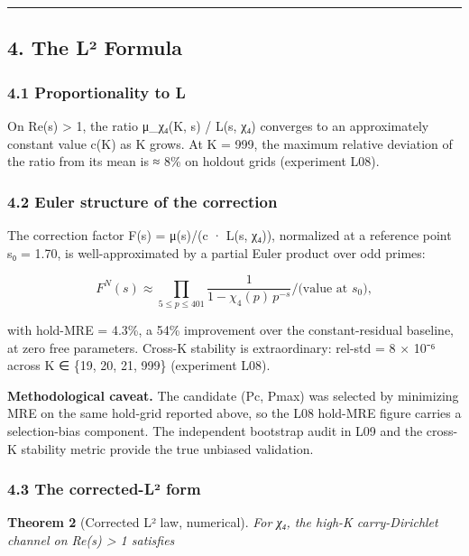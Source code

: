 \documentclass[
  11pt,
]{article}
\begin{document}
\begin{center}\rule{0.5\linewidth}{0.5pt}\end{center}

\newpage

\subsection{4. The L² Formula}\label{the-luxb2-formula}

\subsubsection{4.1 Proportionality to L}\label{proportionality-to-l}

On Re(s) \textgreater{} 1, the ratio μ\_χ₄(K, s) / L(s, χ₄) converges to an
approximately constant value c(K) as K grows. At K = 999, the maximum relative
deviation of the ratio from its mean is ≈ 8\% on holdout grids (experiment L08).

\subsubsection{4.2 Euler structure of the
correction}\label{euler-structure-of-the-correction}

The correction factor F(s) = μ(s)/(c · L(s, χ₄)), normalized at a reference
point s₀ = 1.70, is well-approximated by a partial Euler product over odd
primes:

\[F^N(s) \approx \prod_{5 \leq p \leq 401} \frac{1}{1 - \chi_4(p)\, p^{-s}} \bigg/ \text{(value at } s_0\text{)},\]

with hold-MRE = 4.3\%, a 54\% improvement over the constant-residual baseline,
at zero free parameters. Cross-K stability is extraordinary: rel-std = 8 × 10⁻⁶
across K ∈ \{19, 20, 21, 999\} (experiment L08).

\textbf{Methodological caveat.} The candidate (Pc, Pmax) was selected by
minimizing MRE on the same hold-grid reported above, so the L08 hold-MRE figure
carries a selection-bias component. The independent bootstrap audit in L09 and
the cross-K stability metric provide the true unbiased validation.

\subsubsection{4.3 The corrected-L² form}\label{the-corrected-luxb2-form}

\textbf{Theorem 2} (Corrected L² law, numerical). \emph{For χ₄, the high-K
carry-Dirichlet channel on Re(s) \textgreater{} 1 satisfies}
\end{document}
